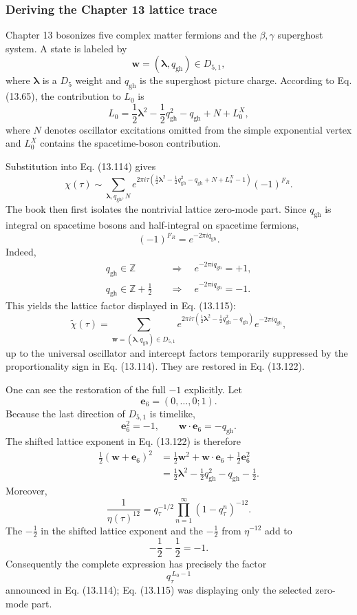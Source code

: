 \documentclass[
  10pt,
  a4paper,
  openany]{book}
\begin{document}
\subsubsection{Deriving the Chapter 13 lattice
trace}\label{deriving-the-chapter-13-lattice-trace}

Chapter 13 bosonizes five complex matter fermions and the
\(\beta,\gamma\) superghost system. A state is labeled by \[
\mathbf w=(\boldsymbol\lambda,q_{\mathrm{gh}})\in D_{5,1},
\] where \(\boldsymbol\lambda\) is a \(D_5\) weight and
\(q_{\mathrm{gh}}\) is the superghost picture charge. According to Eq.
(13.65), the contribution to \(L_0\) is \[
L_0
=
\frac12\boldsymbol\lambda^2
-\frac12q_{\mathrm{gh}}^2
-q_{\mathrm{gh}}
+N
+L_0^{X},
\] where \(N\) denotes oscillator excitations omitted from the simple
exponential vertex and \(L_0^X\) contains the spacetime-boson
contribution.

Substitution into Eq. (13.114) gives \[
\chi(\tau)
\sim
\sum_{\boldsymbol\lambda,q_{\mathrm{gh}},N}
e^{2\pi i\tau
\left(
\frac12\boldsymbol\lambda^2
-\frac12q_{\mathrm{gh}}^2
-q_{\mathrm{gh}}
+N+L_0^X-1
\right)}
(-1)^{F_R}.
\] The book then first isolates the nontrivial lattice zero-mode part.
Since \(q_{\mathrm{gh}}\) is integral on spacetime bosons and
half-integral on spacetime fermions, \[
\boxed{
(-1)^{F_R}=e^{-2\pi i q_{\mathrm{gh}}}.
}
\] Indeed, \[
\begin{aligned}
q_{\mathrm{gh}}\in\mathbb Z
&\quad\Longrightarrow\quad
e^{-2\pi iq_{\mathrm{gh}}}=+1,\\%
q_{\mathrm{gh}}\in\mathbb Z+\frac12
&\quad\Longrightarrow\quad
e^{-2\pi iq_{\mathrm{gh}}}=-1.
\end{aligned}
\] This yields the lattice factor displayed in Eq. (13.115): \[
\widetilde\chi(\tau)
=
\sum_{\mathbf w=(\boldsymbol\lambda,q_{\mathrm{gh}})\in D_{5,1}}
e^{2\pi i\tau
\left(
\frac12\boldsymbol\lambda^2
-\frac12q_{\mathrm{gh}}^2
-q_{\mathrm{gh}}
\right)}
e^{-2\pi iq_{\mathrm{gh}}},
\] up to the universal oscillator and intercept factors temporarily
suppressed by the proportionality sign in Eq. (13.114). They are
restored in Eq. (13.122).

One can see the restoration of the full \(-1\) explicitly. Let \[
\mathbf e_6=(0,\ldots,0;1).
\] Because the last direction of \(D_{5,1}\) is timelike, \[
\mathbf e_6^2=-1,
\qquad
\mathbf w\cdot\mathbf e_6=-q_{\mathrm{gh}}.
\] The shifted lattice exponent in Eq. (13.122) is therefore \[
\begin{aligned}
\frac12(\mathbf w+\mathbf e_6)^2
&=
\frac12\mathbf w^2
+\mathbf w\cdot\mathbf e_6
+\frac12\mathbf e_6^2\\%
&=
\frac12\boldsymbol\lambda^2
-\frac12q_{\mathrm{gh}}^2
-q_{\mathrm{gh}}
-\frac12.
\end{aligned}
\] Moreover, \[
\frac{1}{\eta(\tau)^{12}}
=
q_\tau^{-1/2}
\prod_{n=1}^\infty(1-q_\tau^n)^{-12}.
\] The \(-\tfrac12\) in the shifted lattice exponent and the
\(-\tfrac12\) from \(\eta^{-12}\) add to \[
-\frac12-\frac12=-1.
\] Consequently the complete expression has precisely the factor \[
q_\tau^{\,L_0-1}
\] announced in Eq. (13.114); Eq. (13.115) was displaying only the
selected zero-mode part.
\end{document}

